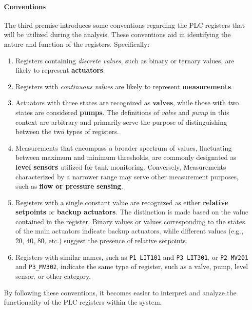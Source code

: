 \paragraph{Conventions}
\label{par:6_conventions}
The third premise introduces some conventions regarding the PLC registers that will be utilized during the analysis. These conventions aid in identifying the nature and function of the registers. Specifically:

\begin{enumerate}
	\item Registers containing \textit{discrete values}, such as binary or ternary values, are likely to represent \textbf{actuators}.
	
	\item Registers with \textit{continuous values} are likely to represent \textbf{measurements}.
	
	\item Actuators with three states are recognized as \textbf{valves}, while those with two states are considered \textbf{pumps}. The definitions of \textit{valve} and \textit{pump} in this context are arbitrary and primarily serve the purpose of distinguishing between the two types of registers.
	
	\item Measurements that encompass a broader spectrum of values, fluctuating between maximum and minimum thresholds, are commonly designated as \textbf{level sensors} utilized for tank monitoring. Conversely, Measurements characterized by a narrower range may serve other measurement purposes, such as \textbf{flow or pressure sensing}.
	
	\item Registers with a single constant value are recognized as either \textbf{relative setpoints} or \textbf{backup actuators}. The distinction is made based on the value contained in the register. Binary values or values corresponding to the states of the main actuators indicate backup actuators, while different values (e.g., 20, 40, 80, etc.) suggest the presence of relative setpoints.

	\item Registers with similar names, such as \texttt{P1\_LIT101} and \texttt{P3\_LIT301}, or \texttt{P2\_MV201} and \texttt{P3\_MV302}, indicate the same type of register, such as a valve, pump, level sensor, or other category.
\end{enumerate}

By following these conventions, it becomes easier to interpret and analyze the functionality of the PLC registers within the system.

